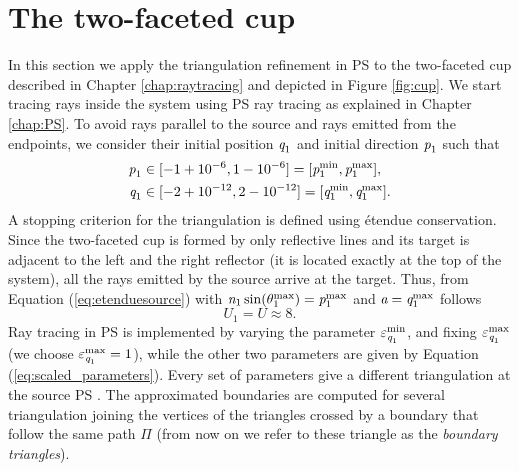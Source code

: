\section{The two-faceted cup}
In this section we apply the triangulation refinement in PS to the two-faceted cup described in Chapter \ref{chap:raytracing} and depicted in Figure \ref{fig:cup}. 
We start tracing rays inside the system using PS ray tracing as explained in Chapter \ref{chap:PS}. To avoid rays parallel to the source and rays emitted from the endpoints, we consider their initial position $\textit{q}_1$ and initial direction $\textit{p}_1$ such that 
\begin{equation*}
\begin{aligned}
\textit{p}_1&\in[-1+10^{-6},1-10^{-6}] = [\textit{p}_1^{\textrm{min}}, \textit{p}_1^{\textrm{max}}], \\ 
\textit{q}_1&\in[-2+10^{-12}, 2-10^{-12}] = [\textit{q}_1^{\textrm{min}}, \textit{q}_1^{\textrm{max}}].
\end{aligned}
\end{equation*} 
A stopping criterion for the triangulation is defined using \'{e}tendue conservation. Since the two-faceted cup is formed by only reflective lines and its target is adjacent to the left and the right reflector (it is located exactly at the top of the system),  all the rays emitted by the source arrive at the target. Thus, from Equation (\ref{eq:etenduesource}) with $\textit{n}_1\sin(\theta_1^{\textrm{max}})=\textit{p}_1^\textrm{max}$ and $\textit{a}=\textit{q}_1^{\textrm{max}}$ follows
\begin{equation}U_1 = U \approx 8. \end{equation}
Ray tracing in PS is implemented by varying the parameter $\varepsilon_{\textit{q}_1}^{\textrm{min}}$, and fixing  $\varepsilon_{\textit{q}_1}^{\textrm{max}}$ (we choose $\varepsilon_{\textit{q}_1}^{\textrm{max}}=1$), while the other two parameters are given by Equation (\ref{eq:scaled_parameters}).
Every set of parameters give a different triangulation at the source PS . The approximated boundaries are computed for several triangulation joining the vertices of the triangles crossed by a boundary that follow the same path $\Pi$ (from now on we refer to these triangle as the \textit{boundary triangles}). 
